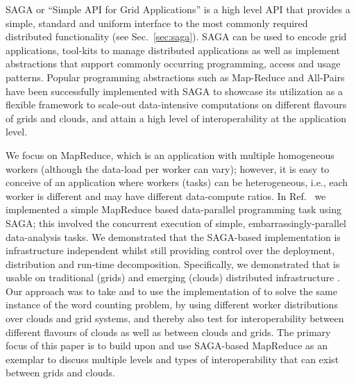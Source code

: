 \documentclass[3p,twocolumn]{elsarticle}
\begin{document}


SAGA or “Simple API for Grid Applications” is a high level API that
provides a simple, standard and uniform interface to the most commonly
required distributed functionality (see Sec.~\ref{sec:saga}). SAGA can
be used to encode grid applications, tool-kits to manage distributed
applications as well as implement abstractions that support commonly
occurring programming, access and usage patterns. Popular programming
abstractions such as Map-Reduce and All-Pairs \cite{allpairs} have been successfully
implemented with SAGA to showcase its utilization as a flexible
framework to scale-out data-intensive computations on different flavours
of grids and clouds, and attain a high level of interoperability at the
application level. 
 
We focus on MapReduce, which is an application with multiple homogeneous
workers (although the data-load per worker can vary); however, it is
easy to conceive of an application where workers (tasks) can be
heterogeneous, i.e., each worker is different and may have different
data-compute ratios.  In Ref.~\cite{saga_ccgrid09} we implemented
a simple MapReduce based data-parallel programming task using SAGA; this
involved the concurrent execution of simple, embarrassingly-parallel
data-analysis tasks.  We demonstrated that the SAGA-based implementation
is infrastructure independent whilst still providing control over the
deployment, distribution and run-time decomposition.  Specifically, we
demonstrated that \sagamapreduce is usable on traditional (grids) and
emerging (clouds) distributed infrastructure .  Our
approach was to take \sagamapreduce and to use the 
implementation of \sagamapreduce to solve the same instance of the word
counting problem, by using different worker distributions over clouds
and grid systems, and thereby also test for interoperability between
different flavours of clouds as well as between clouds and grids.  The
primary focus of this paper is to build upon and use SAGA-based
MapReduce as an exemplar to discuss multiple levels and types of
interoperability that can exist between grids and clouds. 
\end{document}
